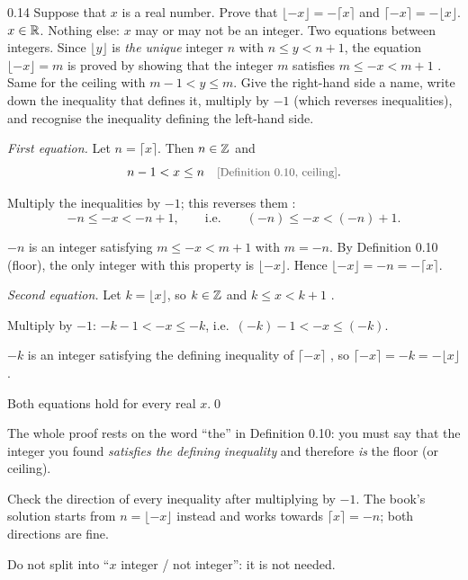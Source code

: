 \begin{bookex}[recommended]{0.14}
Suppose that $x$ is a real number. Prove that $\lfloor-x\rfloor=-\lceil x\rceil$ and $\lceil-x\rceil=-\lfloor x\rfloor$.
\solution
\given $x\in\mathbb{R}$. Nothing else: $x$ may or may not be an integer.
\goal Two equations between integers. Since $\lfloor y\rfloor$ is \emph{the unique} integer $n$ with $n\le y<n+1$, the equation $\lfloor-x\rfloor=m$ is proved by showing that the integer $m$ satisfies $m\le-x<m+1$ . Same for the ceiling with $m-1<y\le m$.
\plan Give the right-hand side a name, write down the inequality that defines it, multiply by $-1$ (which reverses inequalities), and recognise the inequality defining the left-hand side.
\begin{steps}
\item \emph{First equation.} Let $n=\lceil x\rceil$. Then $n\in\mathbb{Z}$ and
\[
n-1<x\le n \why{Definition 0.10, ceiling}.
\]
\item Multiply the inequalities by $-1$; this reverses them :
\[
-n\le-x<-n+1,\qquad\text{i.e.}\qquad (-n)\le-x<(-n)+1 .
\]
\item $-n$ is an integer  satisfying $m\le-x<m+1$ with $m=-n$. By Definition 0.10 (floor), the only integer with this property is $\lfloor-x\rfloor$. Hence $\lfloor-x\rfloor=-n=-\lceil x\rceil$.
\item \emph{Second equation.} Let $k=\lfloor x\rfloor$, so $k\in\mathbb{Z}$ and $k\le x<k+1$ .
\item Multiply by $-1$: $-k-1<-x\le-k$, i.e.\ $(-k)-1<-x\le(-k)$.
\item $-k$ is an integer satisfying the defining inequality of $\lceil-x\rceil$ , so $\lceil-x\rceil=-k=-\lfloor x\rfloor$.
\end{steps}
\conclusion Both equations hold for every real $x$.\qed
\begin{compare}
\item The whole proof rests on the word ``the'' in Definition 0.10: you must say that the integer you found \emph{satisfies the defining inequality} and therefore \emph{is} the floor (or ceiling).
\item Check the direction of every inequality after multiplying by $-1$. The book's solution starts from $n=\lfloor-x\rfloor$ instead and works towards $\lceil x\rceil=-n$; both directions are fine.
\item Do not split into ``$x$ integer / not integer'': it is not needed.
\end{compare}
\end{bookex}

